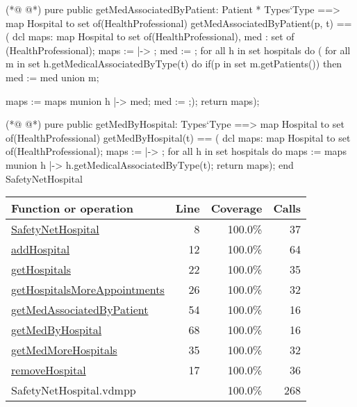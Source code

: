 \begin{vdmpp}[breaklines=true]
(*@
\label{getMedAssociatedByPatient:54}
@*)
 pure public getMedAssociatedByPatient: Patient * Types`Type ==> map Hospital to set of(HealthProfessional)
  getMedAssociatedByPatient(p, t) == (
                     dcl maps: map Hospital to set of(HealthProfessional), med : set of (HealthProfessional);
                     maps := { |-> };
                     med := {};
                     for all h in set hospitals do (
                      for all m in set h.getMedicalAssociatedByType(t) do
                       if(p in set m.getPatients())
                        then med := med union {m};
                       
                      maps := maps munion {h |-> med};
                      med := {};);
                      return maps);
 
(*@
\label{getMedByHospital:68}
@*)
 pure public getMedByHospital: Types`Type ==> map Hospital to set of(HealthProfessional)
  getMedByHospital(t) == (
                     dcl maps: map Hospital to set of(HealthProfessional);
                     maps := { |-> };
                     for all h in set hospitals do
                      maps := maps munion {h |-> h.getMedicalAssociatedByType(t)};
                     return maps);
end SafetyNetHospital
\end{vdmpp}
\bigskip
\begin{longtable}{|l|r|r|r|}
\hline
Function or operation & Line & Coverage & Calls \\
\hline
\hline
\hyperref[SafetyNetHospital:8]{SafetyNetHospital} & 8&100.0\% & 37 \\
\hline
\hyperref[addHospital:12]{addHospital} & 12&100.0\% & 64 \\
\hline
\hyperref[getHospitals:22]{getHospitals} & 22&100.0\% & 35 \\
\hline
\hyperref[getHospitalsMoreAppointments:26]{getHospitalsMoreAppointments} & 26&100.0\% & 32 \\
\hline
\hyperref[getMedAssociatedByPatient:54]{getMedAssociatedByPatient} & 54&100.0\% & 16 \\
\hline
\hyperref[getMedByHospital:68]{getMedByHospital} & 68&100.0\% & 16 \\
\hline
\hyperref[getMedMoreHospitals:35]{getMedMoreHospitals} & 35&100.0\% & 32 \\
\hline
\hyperref[removeHospital:17]{removeHospital} & 17&100.0\% & 36 \\
\hline
\hline
SafetyNetHospital.vdmpp & & 100.0\% & 268 \\
\hline
\end{longtable}

